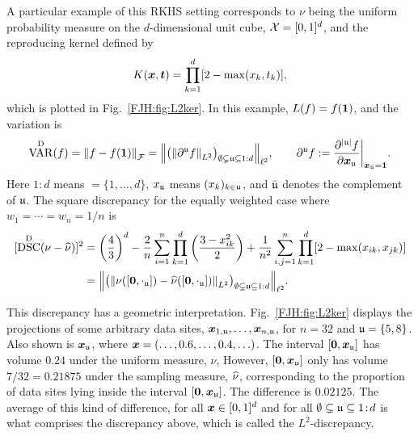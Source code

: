 \documentclass[graybox,footinfo]{svmult}
\DeclareMathOperator{\disc}{DSC}
\DeclareMathOperator{\Var}{VAR}
\begin{document}
A particular example of this RKHS setting corresponds to 
$\nu$ being the uniform probability measure on the $d$-dimensional unit cube, $\mathcal{X} 
= 
[0,1]^d$, and the reproducing kernel defined by \cite{Hic97a}
\begin{equation} \label{FJH:eq:L2Kdef}
K(\bsx,\bst) =\prod_{k = 1}^d [2 - \max(x_k,t_k)],
\end{equation}
which is plotted in Fig.\ \ref{FJH:fig:L2ker}.  In this example, $L(f) = f({\boldsymbol{1}})$, and the 
variation is 
\begin{equation*}
\Var^\Dt(f)  = \norm{f-f(\bsone)}_\cf = \Bigl \lVert \bigl ( \norm{\partial^\fraku f}_{L^2}\bigr 
)_{\emptyset \subsetneq \fraku \subseteq 1:d} \Bigr \rVert_{\ell^2} , \qquad 
\partial^\fraku f : = \frac{\partial^{\lvert\fraku\rvert} f}{\partial \bsx_\fraku} \biggr 
\rvert_{\bsx_{\bar{\fraku}} = \bsone}.
\end{equation*}
Here $1\!:\!d$ means  $= \{1, \ldots, d\}$, $x_{\mathfrak{u}}$ means $(x_k)_{k \in {\mathfrak{u}}}$, and 
$\bar{{\mathfrak{u}}}$ 
denotes the complement of ${\mathfrak{u}}$.  
The square discrepancy for the equally weighted case where $w_1 = \cdots = w_n = 1/n$ 
is
\begin{align}
\nonumber
[\disc^\Dt(\nu - \hnu)]^2  &= \left(\frac 43\right)^d - \frac{2}n \sum_{i=1}^n \prod_{k=1}^d 
\left (\frac{3 - x_{ik}^2}{2} \right) + \frac{1}{n^2}\sum_{i,j=1}^n \prod_{k = 1}^d [2 - 
\max(x_{ik},x_{jk})] 
\\ &= \Bigl \lVert \bigl ( \norm{\nu([\bszero,\cdot_\fraku]) - 
	\hnu([\bszero,\cdot_\fraku])}_{L^2}\bigr )_{\emptyset \subsetneq \fraku \subseteq 1:d} 
	\Bigr 
	\rVert_{\ell^2}. \label{FJH:eq:L2disc}
\end{align}

This discrepancy has a geometric interpretation. Fig.\ \ref{FJH:fig:L2ker} displays the 
projections of some arbitrary 
data sites, ${\boldsymbol{x}}_{1,{\mathfrak{u}}}, \ldots, {\boldsymbol{x}}_{n,{\mathfrak{u}}}$, for $n=32$ and ${\mathfrak{u}} = \{5,8\}$.  
Also 
shown is ${\boldsymbol{x}}_{\mathfrak{u}}$, where ${\boldsymbol{x}} = (\ldots, 0.6, \ldots, 0.4, \ldots)$. The interval 
$[{\boldsymbol{0}},{\boldsymbol{x}}_{\mathfrak{u}}]$ has volume $0.24$ under the uniform measure, $\nu$, However, 
$[{\boldsymbol{0}},{\boldsymbol{x}}_{\mathfrak{u}}]$ only has 
volume $7/32 = 0.21875$ under the sampling measure, $\widehat{\nu}$, corresponding to the 
proportion of data sites lying inside the interval $[{\boldsymbol{0}},{\boldsymbol{x}}_{\mathfrak{u}}]$. The difference is 
$0.02125$.  The average of this kind of difference, for all ${\boldsymbol{x}} \in [0,1]^d$ and for all 
$\emptyset \subsetneq {\mathfrak{u}} 
\subseteq 1\!:\!d$ is what comprises the discrepancy above, which is called the 
$L^2$-discrepancy.
\end{document}
